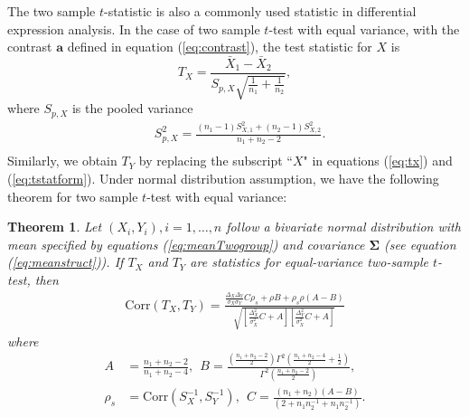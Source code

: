 \documentclass[12pt, a4paper]{article}
\newtheorem{theorem}{Theorem}       %
\newcommand{\cor}{\text{Corr}}
\begin{document}
	The two sample $t$-statistic is also a commonly used statistic in differential expression analysis.	In the case of two sample $t$-test with equal variance, with the contrast $\bm a$ defined in equation (\ref{eq:contrast}), the test statistic for $X$ is 
	\begin{equation}\label{eq:tx}
		T_X= \frac{\bar{X}_1- \bar{X}_2}{S_{p, X}\sqrt{\frac{1}{n_1} + \frac{1}{n_2}}},
	\end{equation}
	where $S_{p, X}$ is the pooled variance
	 \begin{equation}\label{eq:tstatform}
	 \begin{aligned}
	 &S_{p, X}^2 = \frac{(n_1-1)S_{X, 1}^2 + (n_2 -1)S_{X,2}^2}{n_1 + n_2 -2}. \\
	 \end{aligned}
	 \end{equation}
 Similarly, we obtain $T_Y$ by replacing the subscript ``$X$" in equations (\ref{eq:tx}) and (\ref{eq:tstatform}). Under normal distribution assumption, we have the following theorem for two sample $t$-test with equal variance:
	\begin{theorem}\label{thm:tstat}
		Let $(X_i, Y_i), i = 1, \ldots, n$ follow a bivariate normal distribution with mean specified by equations (\ref{eq:meanTwogroup}) and covariance $\bm \Sigma$ (see equation (\ref{eq:meanstruct})). If $T_X$ and $T_Y$ are statistics for equal-variance two-sample $t$-test, then 
		\begin{equation}\label{eq:ttestcor}
	\begin{aligned}
	 \cor(T_X, T_Y) =   
	 \frac{\frac{\Delta_X\Delta_Y}{\sigma_X\sigma_Y}C \rho_{s}+ \rho B
		+ \rho_{s}\rho(A-B)}{\sqrt{\left[ \frac{\Delta_X^2}{\sigma_X^2}C + A\right]\left[\frac{\Delta_Y^2}{\sigma_X^2}C +   A\right]}}
	\end{aligned}
		\end{equation}
	where 
			 \begin{equation}\label{eq:AandB}
			 	 \begin{aligned}
			 	 A & = \frac{n_1 + n_2-2}{n_1 + n_2-4}, ~~B =
			 	 \frac{(\frac{n_1 + n_2 -2}{2})\Gamma^2(\frac{n_1 + n_2 -4}{2} + \frac{1}{2})}{\Gamma^2(\frac{n_1+ n_2 -2}{2})}, \\
			 	 \rho_s & = \cor(S_X^{-1}, S_Y^{-1}), ~~ 
			 	 C = \frac{(n_1 + n_2)(A-B)}{(2 + n_1n_2^{-1} + n_1n_2^{-1})}.
			 	 \end{aligned}
			 \end{equation}	 
	\end{theorem}
\end{document}
